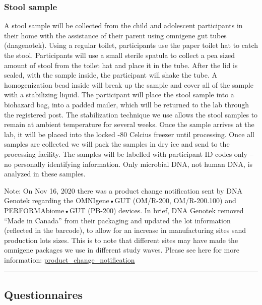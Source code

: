 \documentclass[]{book}
\begin{document}
\hypertarget{stool-sample}{%
\subsubsection{Stool sample}\label{stool-sample}}

A stool sample will be collected from the child and adolescent participants in their home with the assistance of their parent using omnigene gut tubes (dnagenotek). Using a regular toilet, participants use the paper toilet hat to catch the stool. Participants will use a small sterile spatula to collect a pea sized amount of stool from the toilet hat and place it in the tube. After the lid is sealed, with the sample inside, the participant will shake the tube. A homogenization bead inside will break up the sample and cover all of the sample with a stabilizing liquid. The participant will place the stool sample into a biohazard bag, into a padded mailer, which will be returned to the lab through the registered post. The stabilization technique we use allows the stool samples to remain at ambient temperature for several weeks. Once the sample arrives at the lab, it will be placed into the locked -80 Celcius freezer until processing. Once all samples are collected we will pack the samples in dry ice and send to the processing facility. The samples will be labelled with participant ID codes only -- no personally identifying information. Only microbial DNA, not human DNA, is analyzed in these samples.

Note: On Nov 16, 2020 there was a product change notification sent by DNA Genotek regarding the OMNIgene•GUT (OM/R-200, OM/R-200.100) and PERFORMAbiome•GUT (PB-200) devices. In brief, DNA Genotek removed ``Made in Canada'' from their packaging and updated the lot information (reflected in the barcode), to allow for an increase in manufacturing sites sand production lots sizes. This is to note that different sites may have made the omnigene packages we use in different study waves. Please see here for more information: \href{https://ucla.app.box.com/file/748332038901}{product\_change\_notification}

\begin{center}\rule{0.5\linewidth}{0.5pt}\end{center}

\hypertarget{questionnaires}{%
\subsection{Questionnaires}\label{questionnaires}}
\end{document}

